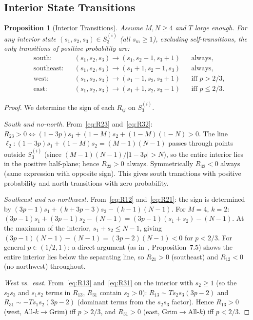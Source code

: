 \documentclass[12pt,a4paper]{article}
\newtheorem{proposition}{Proposition}[section]
\begin{document}
\subsection{Interior State Transitions}

\begin{proposition}[Interior Transitions]\label{prop:interior}
Assume $M,N\geq 4$ and $T$ large enough.
For any interior state $(s_1,s_2,s_3)\in S_3^{(i)}$ (all $s_m\geq 1$),
excluding self-transitions, the only transitions of positive probability are:
\begin{align*}
  &\text{south:}    && (s_1,s_2,s_3)\to(s_1,s_2-1,s_3+1) &&\text{always},\\
  &\text{southeast:}&& (s_1,s_2,s_3)\to(s_1+1,s_2-1,s_3) &&\text{always},\\
  &\text{west:}     && (s_1,s_2,s_3)\to(s_1-1,s_2,s_3+1) &&\text{iff } p>2/3,\\
  &\text{east:}     && (s_1,s_2,s_3)\to(s_1+1,s_2,s_3-1) &&\text{iff } p\leq 2/3.
\end{align*}
\end{proposition}

\begin{proof}
We determine the sign of each $R_{ij}$ on $S_3^{(i)}$.

\textit{South and no-north.}  From~\eqref{eq:R23} and~\eqref{eq:R32}:
$R_{23}>0 \Leftrightarrow (1-3p)s_1+(1-M)s_2+(1-M)(1-N)>0$.
The line $\ell_2: (1-3p)s_1+(1-M)s_2=(M-1)(N-1)$ passes through points
outside $S_3^{(i)}$ (since $(M-1)(N-1)/|1-3p|>N$), so the entire interior
lies in the positive half-plane; hence $R_{23}>0$ always. Symmetrically
$R_{32}<0$ always (same expression with opposite sign). This gives
south transitions with positive probability and north transitions with zero probability.

\textit{Southeast and no-northwest.}  From~\eqref{eq:R12} and~\eqref{eq:R21}:
the sign is determined by $(3p-1)s_1+(k+3p-3)s_2-(k-1)(N-1)$.
For $M=4$, $k=2$: $(3p-1)s_1+(3p-1)s_2-(N-1)=(3p-1)(s_1+s_2)-(N-1)$.
At the maximum of the interior, $s_1+s_2\leq N-1$, giving
$(3p-1)(N-1)-(N-1)=(3p-2)(N-1)<0$ for $p<2/3$.
For general $p\in(1/2,1)$: a direct argument (as in~\cite{LK2026}, Proposition~7.5)
shows the entire interior lies below the separating line, so $R_{21}>0$ (southeast)
and $R_{12}<0$ (no northwest) throughout.

\textit{West vs.\ east.}  From~\eqref{eq:R13} and~\eqref{eq:R31} on the
interior with $s_2\geq 1$ (so the $s_2s_3$ and $s_1s_2$ terms in $R_{13}$,
$R_{31}$ contain $s_2>0$):
$R_{13}\sim T s_2 s_3(3p-2)$ and $R_{31}\sim -Ts_1 s_2(3p-2)$
(dominant terms from the $s_2s_3$ factor). Hence
$R_{13}>0$ (west, All-$k\to$Grim) iff $p>2/3$, and
$R_{31}>0$ (east, Grim$\to$All-$k$) iff $p<2/3$.
\end{proof}
\end{document}
